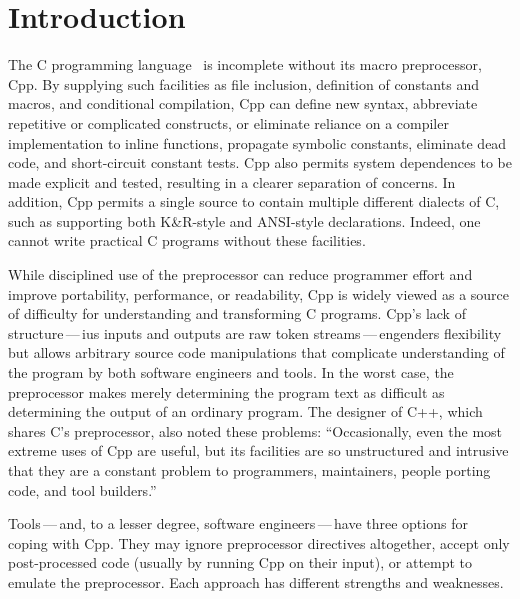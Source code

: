 \documentclass[10pt]{article}
\begin{document}
\section{Introduction}

The C programming language~\cite{KernighanR88,Harbison91} is incomplete
without its macro preprocessor, Cpp.  By supplying such facilities as file
inclusion, definition of constants and macros, and conditional compilation,
Cpp can define new syntax, abbreviate repetitive or complicated constructs,
or eliminate reliance on a compiler implementation to inline functions,
propagate symbolic constants, eliminate dead code, and short-circuit
constant tests.  Cpp also permits system dependences to be made explicit
and tested, resulting in a clearer separation of concerns.  In addition,
Cpp permits a single source to contain multiple different dialects of C,
such as supporting both K\&R-style and ANSI-style declarations.  Indeed,
one cannot write practical C programs without these facilities.

While disciplined use of the preprocessor can reduce programmer effort
and improve portability, performance, or readability, Cpp is widely
viewed as a source of difficulty for understanding and transforming C
programs.  Cpp's lack of structure\,---\,ius inputs and
outputs are raw token streams\,---\,engenders flexibility but allows
arbitrary source code manipulations that complicate 
understanding of the program by both software engineers and tools.  In
the worst case, the preprocessor makes merely determining the program
text as difficult as determining the output of an ordinary program.
The designer of C++, which shares C's preprocessor, also noted these
problems: ``Occasionally, even the most extreme uses of Cpp are
useful, but its facilities are so unstructured and intrusive that they
are a constant problem to programmers, maintainers, people porting
code, and tool builders.''~\cite[p.~424]{Stroustrup-DesignEvolution}

Tools\,---\,and, to a lesser degree, software engineers\,---\,have
three options for coping with Cpp.  They may ignore preprocessor
directives altogether, accept only post-processed code (usually by
running Cpp on their input), or attempt to emulate the preprocessor.
Each approach has different strengths and weaknesses.
\end{document}
